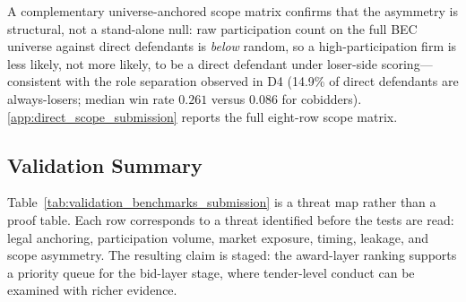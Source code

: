 A complementary universe-anchored scope matrix confirms that the
asymmetry is structural, not a stand-alone null: raw participation
count on the full BEC universe against direct defendants is
\emph{below} random, so a high-participation firm is less likely,
not more likely, to be a direct defendant under loser-side
scoring---consistent with the role separation observed in D4
(14.9\% of direct defendants are always-losers; median win rate
$0.261$ versus $0.086$ for cobidders).
\ref{app:direct_scope_submission} reports the full
eight-row scope matrix.

\subsection{Validation Summary}
\label{sec:validation_summary}

Table~\ref{tab:validation_benchmarks_submission} is a threat map
rather than a proof table. Each row corresponds to a threat
identified before the tests are read: legal anchoring,
participation volume, market exposure, timing, leakage, and
scope asymmetry. The resulting claim is staged: the award-layer
ranking supports a priority queue for the bid-layer stage, where
tender-level conduct can be examined with richer evidence.

